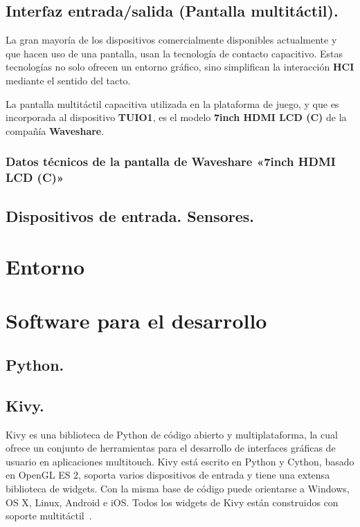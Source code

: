 \subsection{Interfaz entrada/salida (Pantalla multitáctil).}
La gran mayoría de los dispositivos comercialmente disponibles actualmente y que hacen uso de una pantalla, usan la tecnología de contacto capacitivo. Estas tecnologías no solo ofrecen un entorno gráfico, sino simplifican la interacción \textbf{HCI} mediante el sentido del tacto.\

La pantalla multitáctil capacitiva utilizada en la plataforma de juego, y que es incorporada al dispositivo \textbf{TUIO1}, es el modelo \textbf{7inch HDMI LCD (C)} de la compañía \textbf{Waveshare}.
\subsubsection{Datos técnicos de la pantalla de Waveshare «7inch HDMI LCD (C)»}



\subsection{Dispositivos de entrada. Sensores.}



\section{Entorno}




\section{Software para el desarrollo}

\subsection{Python.}

\subsection{Kivy.}
Kivy es una biblioteca de Python de código abierto y multiplataforma, la cual ofrece un conjunto de herramientas para el desarrollo de interfaces gráficas de usuario en aplicaciones multitouch.
Kivy está escrito en Python y Cython, basado en OpenGL ES 2, soporta varios dispositivos de entrada y tiene una extensa biblioteca de widgets. Con la misma base de código puede orientarse a Windows, OS X, Linux, Android e iOS. Todos los widgets de Kivy están construidos con soporte multitáctil~\cite{Kivy}. 

